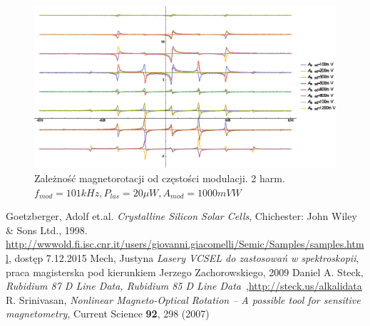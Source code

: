 \documentclass[a4paper,10pt]{article}
\begin{document}
\begin{figure}[h!]
\centering
 \includegraphics[width=\textwidth]{panoramy_2H_odam.eps}
 \caption{Zależność magnetorotacji od częstości modulacji. 2 harm. $f_{mod}=101kHz, P_{las}=20 \mu W, A_{mod}=1000mV W$}
 \label{fig:panodam2}
\end{figure}



\begin{thebibliography}{99}
 Goetzberger, Adolf et.al. \emph{Crystalline Silicon Solar Cells}, Chichester: John Wiley \& Sons Ltd., 1998.
 \url{http://wwwold.fi.isc.cnr.it/users/giovanni.giacomelli/Semic/Samples/samples.html}, dostęp 7.12.2015
  Mech, Justyna \emph{Lasery VCSEL do zastosowań w spektroskopii}, praca magisterska pod kierunkiem Jerzego Zachorowskiego, 2009
 Daniel A. Steck, \emph{Rubidium 87 D Line Data, Rubidium 85 D Line Data}~,\url{http://steck.us/alkalidata}
 R. Srinivasan,\textit{ Nonlinear Magneto-Optical Rotation – A possible tool for sensitive magnetometry}, Current Science \textbf{92}, 298 (2007)

\end{thebibliography}
\end{document}
